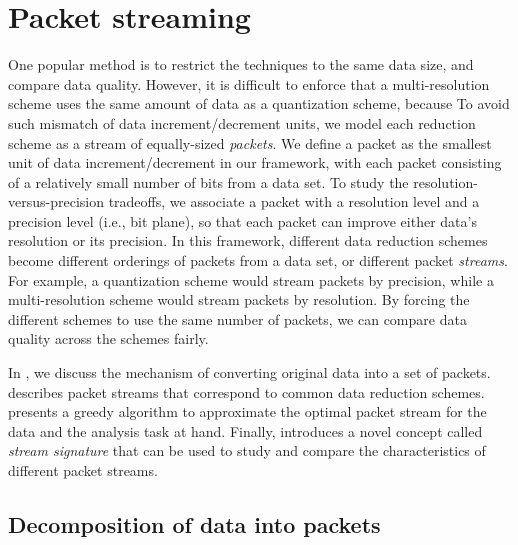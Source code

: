 \section{Packet streaming}\label{sec:terminologies}

One popular method is to restrict the techniques to the same data size, and
compare data quality. However, it is difficult to enforce that a
multi-resolution scheme uses the same amount of data as a quantization scheme,
because   To avoid such mismatch of data increment/decrement units, we model
each reduction scheme as a stream of equally-sized \emph{packets}.  We define a
packet as the smallest unit of data increment/decrement in our framework, with
each packet consisting of a relatively small number of bits from a data set. To
study the resolution-versus-precision tradeoffs, we associate a packet with a
resolution level and a precision level (i.e., bit plane), so that each packet
can improve either data's resolution or its precision. In this framework,
different data reduction schemes become different orderings of packets from a
data set, or different packet \emph{streams}.  For example, a quantization
scheme would stream packets by precision, while a multi-resolution scheme would
stream packets by resolution. By forcing the different schemes to use the same
number of packets, we can compare data quality across the schemes fairly.

In , we discuss the mechanism of converting
original data into a set of packets. 
describes packet streams that correspond to common data reduction schemes.
 presents a greedy algorithm to approximate the
optimal packet stream for the data and the analysis task at hand. Finally,
 introduces a novel concept called \emph{stream
signature} that can be used to study and compare the characteristics of
different packet streams.

\subsection{Decomposition of data into packets}\label{sec:data-streaming-framework}

